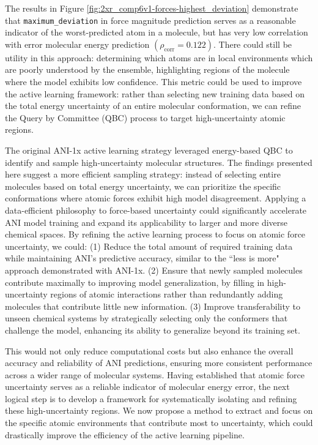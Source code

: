 The results in Figure \ref{fig:2xr_comp6v1-forces-highest_deviation} demonstrate that \verb|maximum_deviation| in force magnitude prediction serves as a reasonable indicator of the worst-predicted atom in a molecule, but has very low correlation with error molecular energy prediction $(\rho_\text{corr} = 0.122)$.
There could still be utility in this approach: determining which atoms are in local environments which are poorly understood by the ensemble, highlighting regions of the molecule where the model exhibits low confidence. 
This metric could be used to improve the active learning framework: rather than selecting new training data based on the total energy uncertainty of an entire molecular conformation, we can refine the Query by Committee (QBC) process to target high-uncertainty atomic regions.

The original ANI-1x active learning strategy \cite{ani-1x} leveraged energy-based QBC to identify and sample high-uncertainty molecular structures.
The findings presented here suggest a more efficient sampling strategy: instead of selecting entire molecules based on total energy uncertainty, we can prioritize the specific conformations where atomic forces exhibit high model disagreement. 
Applying a data-efficient philosophy to force-based uncertainty could significantly accelerate ANI model training and expand its applicability to larger and more diverse chemical spaces. 
By refining the active learning process to focus on atomic force uncertainty, we could:
(1) Reduce the total amount of required training data while maintaining ANI’s predictive accuracy, similar to the ``less is more" approach demonstrated with ANI-1x. 
(2) Ensure that newly sampled molecules contribute maximally to improving model generalization, by filling in high-uncertainty regions of atomic interactions rather than redundantly adding molecules that contribute little new information. 
(3) Improve transferability to unseen chemical systems by strategically selecting only the conformers that challenge the model, enhancing its ability to generalize beyond its training set.

This would not only reduce computational costs but also enhance the overall accuracy and reliability of ANI predictions, ensuring more consistent performance across a wider range of molecular systems.
Having established that atomic force uncertainty serves as a reliable indicator of molecular energy error, the next logical step is to develop a framework for systematically isolating and refining these high-uncertainty regions. 
We now propose a method to extract and focus on the specific atomic environments that contribute most to uncertainty, which could drastically improve the efficiency of the active learning pipeline.

